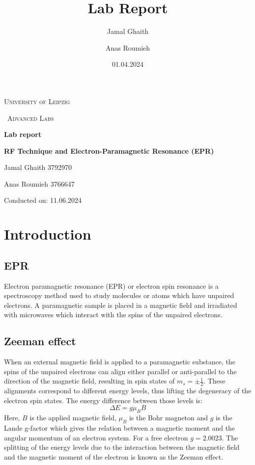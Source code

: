 \documentclass{article}
\title{Lab Report}
\author{Jamal Ghaith}
\author{Anas Roumieh}
\date{01.04.2024}
\begin{document}
\begin{titlepage}
	\centering
	{\scshape\LARGE University of Leipzig \par}
	\vspace{1cm}
	{\scshape\ Advanced Labs\par}
	\vspace{1.5cm}
	{\huge\bfseries Lab report\par}
	\vspace{2cm}
	{\huge\bfseries RF Technique and Electron-Paramagnetic Resonance (EPR)\par}
	\vspace{2cm}
	{\Large Jamal Ghaith 3792970\par}
    {\Large Anas Roumieh 3766647\par}
	\vfill

    {\Large Conducted on: 11.06.2024 \par}
	\vfill
\end{titlepage}


\tableofcontents
{}
\pagebreak{}

\section{Introduction}


\subsection{EPR}
Electron paramagnetic resonance (EPR) or electron spin resonance is a spectroscopy method used to study molecules or atoms which have unpaired electrons. A paramagnetic sample is placed in a magnetic field and irradiated with microwaves which interact with the spins of the unpaired electrons. 

\subsection{Zeeman effect}
When an external magnetic field is applied to a paramagnetic substance, the spins of the unpaired electrons can align either parallel or anti-parallel to the direction of the magnetic field, resulting in spin states of $m_s = \pm \frac{1}{2}$. These alignments correspond to different energy levels, thus lifting the degeneracy of the electron spin states. The energy difference between those levels is: 
\begin{equation}
    \Delta E = g\mu_B B
\end{equation}
Here, $B$ is the applied magnetic field, $\mu_B$ is the Bohr magneton and $g$ is the Lande g-factor which gives the relation between a magnetic moment and the angular momentum of an electron system. For a free electron $g = 2.0023$. The splitting of the energy levels due to the interaction between the magnetic field and the magnetic moment of the electron is known as the Zeeman effect. 
\end{document}
